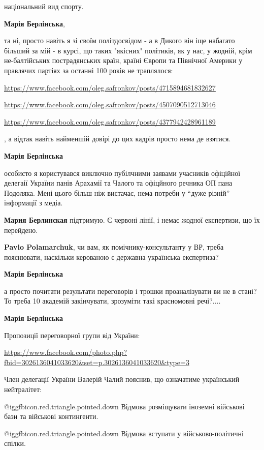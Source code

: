 \begin{itemize}
національний вид спорту.

\begin{itemize} %
\textbf{Марія Берлінська}, 

та ні, просто навіть я зі своїм політдосвідом - а в Дикого він іще набагато
більший за мій - в курсі, що таких "якісних" політиків, як у нас, у жодній,
крім не-балтійських пострадянських країн, країні Європи та Північної Америки у
правлячих партіях за останні 100 років не траплялося:

\url{https://www.facebook.com/oleg.safronkov/posts/4715894681832627}

\url{https://www.facebook.com/oleg.safronkov/posts/4507090512713046}

\url{https://www.facebook.com/oleg.safronkov/posts/4377942428961189}

, а відтак навіть найменшій довірі до цих кадрів просто нема де взятися.

\textbf{Марія Берлінська} 

особисто я користувався виключно пубілчними заявами учасників офіційної
делегаії України панів Арахамії та Чалого та офіцйного речника ОП пана
Подоляка. Мені цього більш ніж вистачає, нема потреби у \enquote{дуже різній}
інформації з медіа.

\textbf{Мария Берлинская} підтримую.
Є червоні лінії, і немає жодної експертизи, що їх перейдено.

\textbf{Pavlo Polamarchuk}, чи вам, як помічнику-консультанту у ВР, треба пояснювати, наскільки керованою є державна українська експертиза?

\textbf{Марія Берлінська} 

а просто почитати результати переговорів і трошки проаналізувати ви не в стані?
То треба 10 академій закінчувати, зрозуміти такі красномовні речі?....

\textbf{Марія Берлінська} 

Пропозиції переговорної групи від України:

\url{https://www.facebook.com/photo.php?fbid=3026136041033620&set=p.3026136041033620&type=3}

Член делегації України Валерій Чалий пояснив, що означатиме український нейтралітет:

 @igg{fbicon.red.triangle.pointed.down}  Відмова розміщувати іноземні військові бази та військові контингенти.

 @igg{fbicon.red.triangle.pointed.down}  Відмова вступати у військово-політичні спілки.


\end{itemize}
\end{itemize}
